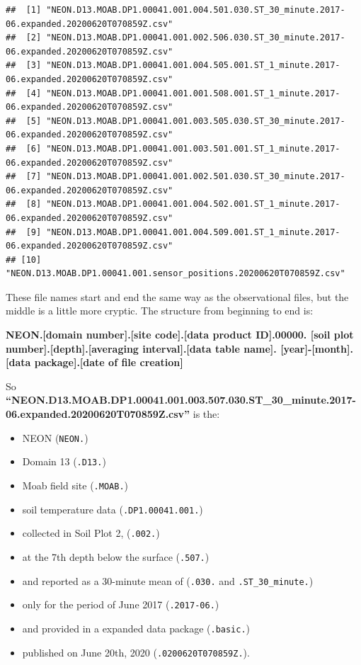 \documentclass[]{book}
\providecommand{\tightlist}{%
  \setlength{\itemsep}{0pt}\setlength{\parskip}{0pt}}
\begin{document}
\begin{verbatim}
##  [1] "NEON.D13.MOAB.DP1.00041.001.004.501.030.ST_30_minute.2017-06.expanded.20200620T070859Z.csv"
##  [2] "NEON.D13.MOAB.DP1.00041.001.002.506.030.ST_30_minute.2017-06.expanded.20200620T070859Z.csv"
##  [3] "NEON.D13.MOAB.DP1.00041.001.004.505.001.ST_1_minute.2017-06.expanded.20200620T070859Z.csv" 
##  [4] "NEON.D13.MOAB.DP1.00041.001.001.508.001.ST_1_minute.2017-06.expanded.20200620T070859Z.csv" 
##  [5] "NEON.D13.MOAB.DP1.00041.001.003.505.030.ST_30_minute.2017-06.expanded.20200620T070859Z.csv"
##  [6] "NEON.D13.MOAB.DP1.00041.001.003.501.001.ST_1_minute.2017-06.expanded.20200620T070859Z.csv" 
##  [7] "NEON.D13.MOAB.DP1.00041.001.002.501.030.ST_30_minute.2017-06.expanded.20200620T070859Z.csv"
##  [8] "NEON.D13.MOAB.DP1.00041.001.004.502.001.ST_1_minute.2017-06.expanded.20200620T070859Z.csv" 
##  [9] "NEON.D13.MOAB.DP1.00041.001.004.509.001.ST_1_minute.2017-06.expanded.20200620T070859Z.csv" 
## [10] "NEON.D13.MOAB.DP1.00041.001.sensor_positions.20200620T070859Z.csv"
\end{verbatim}

These file names start and end the same way as the observational files, but the
middle is a little more cryptic. The structure from beginning to end is:

\textbf{NEON.{[}domain number{]}.{[}site code{]}.{[}data product ID{]}.00000.
{[}soil plot number{]}.{[}depth{]}.{[}averaging interval{]}.{[}data table name{]}.
{[}year{]}-{[}month{]}.{[}data package{]}.{[}date of file creation{]}}

So \textbf{``NEON.D13.MOAB.DP1.00041.001.003.507.030.ST\_30\_minute.2017-06.expanded.20200620T070859Z.csv''} is the:

\begin{itemize}
\tightlist
\item
  NEON (\texttt{NEON.})
\item
  Domain 13 (\texttt{.D13.})
\item
  Moab field site (\texttt{.MOAB.})
\item
  soil temperature data (\texttt{.DP1.00041.001.})
\item
  collected in Soil Plot 2, (\texttt{.002.})
\item
  at the 7th depth below the surface (\texttt{.507.})
\item
  and reported as a 30-minute mean of (\texttt{.030.} and \texttt{.ST\_30\_minute.})
\item
  only for the period of June 2017 (\texttt{.2017-06.})
\item
  and provided in a expanded data package (\texttt{.basic.})
\item
  published on June 20th, 2020 (\texttt{.0200620T070859Z.}).
\end{itemize}
\end{document}
